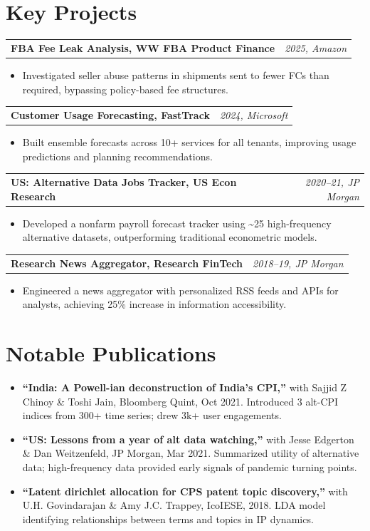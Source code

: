 \documentclass[10pt,letterpaper]{article}
\makeatletter
\newcommand{\resumeItem}[1]{\item\small{#1\vspace{-2pt}}}
\newcommand{\resumeProject}[2]{
  \vspace{1pt}
  \begin{tabularx}{\textwidth}{@{}>{\raggedright\arraybackslash}X@{}r@{}}
    \textbf{\small #1} & \textit{\footnotesize #2} \\
  \end{tabularx}
  \vspace{-1pt}
}
\makeatother
\begin{document}
\section{Key Projects}

\resumeProject{FBA Fee Leak Analysis, WW FBA Product Finance}{2025, Amazon}
\begin{itemize}
  \resumeItem{Investigated seller abuse patterns in shipments sent to fewer FCs than required, bypassing policy-based fee structures.}
\end{itemize}

\resumeProject{Customer Usage Forecasting, FastTrack}{2024, Microsoft}
\begin{itemize}
  \resumeItem{Built ensemble forecasts across 10+ services for all tenants, improving usage predictions and planning recommendations.}
\end{itemize}

\resumeProject{US: Alternative Data Jobs Tracker, US Econ Research}{2020--21, JP Morgan}
\begin{itemize}
  \resumeItem{Developed a nonfarm payroll forecast tracker using \textasciitilde25 high-frequency alternative datasets, outperforming traditional econometric models.}
\end{itemize}

\resumeProject{Research News Aggregator, Research FinTech}{2018--19, JP Morgan}
\begin{itemize}
  \resumeItem{Engineered a news aggregator with personalized RSS feeds and APIs for analysts, achieving 25\% increase in information accessibility.}
\end{itemize}

\section{Notable Publications}

\begin{itemize}
  \resumeItem{\textbf{``India: A Powell-ian deconstruction of India's CPI,''} with Sajjid Z Chinoy \& Toshi Jain, Bloomberg Quint, Oct 2021. Introduced 3 alt-CPI indices from 300+ time series; drew 3k+ user engagements.}
  \resumeItem{\textbf{``US: Lessons from a year of alt data watching,''} with Jesse Edgerton \& Dan Weitzenfeld, JP Morgan, Mar 2021. Summarized utility of alternative data; high-frequency data provided early signals of pandemic turning points.}
  \resumeItem{\textbf{``Latent dirichlet allocation for CPS patent topic discovery,''} with U.H. Govindarajan \& Amy J.C. Trappey, IcoIESE, 2018. LDA model identifying relationships between terms and topics in IP dynamics.}
\end{itemize}
\end{document}
